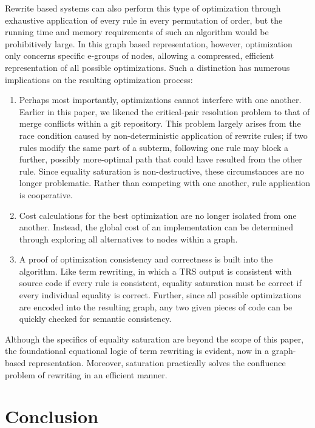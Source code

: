 \documentclass{article}
\begin{document}
Rewrite based systems can also perform this type of optimization through exhaustive application of every rule in every permutation of order, but the running time and memory requirements of such an algorithm would be prohibitively large. In this graph based representation, however, optimization only concerns specific e-groups of nodes, allowing a compressed, efficient representation of all possible optimizations. Such a distinction has numerous implications on the resulting optimization process:
\begin{enumerate}
    \item Perhaps most importantly, optimizations cannot interfere with one another. Earlier in this paper, we likened the critical-pair resolution problem to that of merge conflicts within a git repository. This problem largely arises from the race condition caused by non-deterministic application of rewrite rules; if two rules modify the same part of a subterm, following one rule may block a further, possibly more-optimal path that could have resulted from the other rule. Since equality saturation is non-destructive, these circumstances are no longer problematic. Rather than competing with one another, rule application is cooperative.
    \item Cost calculations for the best optimization are no longer isolated from one another. Instead, the global cost of an implementation can be determined through exploring all alternatives to nodes within a graph.
    \item A proof of optimization consistency and correctness is built into the algorithm. Like term rewriting, in which a TRS output is consistent with source code if every rule is consistent, equality saturation must be correct if every individual equality is correct. Further, since all possible optimizations are encoded into the resulting graph, any two given pieces of code can be quickly checked for semantic consistency.
\end{enumerate}

Although the specifics of equality saturation are beyond the scope of this paper, the foundational equational logic of term rewriting is evident, now in a graph-based representation. Moreover, saturation practically solves the confluence problem of rewriting in an efficient manner.


\section{Conclusion}
\end{document}
